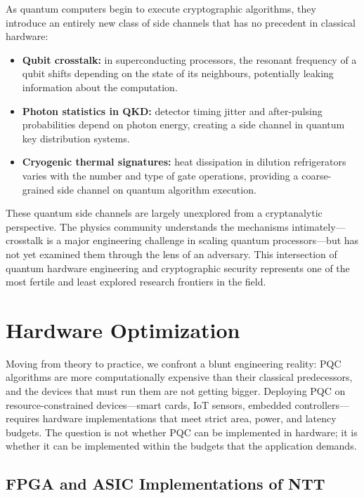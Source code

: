 As quantum computers begin to execute cryptographic algorithms, they introduce an entirely new class of side channels that has no precedent in classical hardware:
\begin{itemize}
\item \textbf{Qubit crosstalk:} in superconducting processors, the resonant frequency of a qubit shifts depending on the state of its neighbours, potentially leaking information about the computation.
\item \textbf{Photon statistics in QKD:} detector timing jitter and after-pulsing probabilities depend on photon energy, creating a side channel in quantum key distribution systems.
\item \textbf{Cryogenic thermal signatures:} heat dissipation in dilution refrigerators varies with the number and type of gate operations, providing a coarse-grained side channel on quantum algorithm execution.
\end{itemize}

These quantum side channels are largely unexplored from a cryptanalytic perspective.  The physics community understands the mechanisms intimately---crosstalk is a major engineering challenge in scaling quantum processors---but has not yet examined them through the lens of an adversary.  This intersection of quantum hardware engineering and cryptographic security represents one of the most fertile and least explored research frontiers in the field.


\section{Hardware Optimization}
\label{sec:hardware}

Moving from theory to practice, we confront a blunt engineering reality: PQC algorithms are more computationally expensive than their classical predecessors, and the devices that must run them are not getting bigger.  Deploying PQC on resource-constrained devices---smart cards, IoT sensors, embedded controllers---requires hardware implementations that meet strict area, power, and latency budgets.  The question is not whether PQC can be implemented in hardware; it is whether it can be implemented within the budgets that the application demands.

\subsection{FPGA and ASIC Implementations of NTT}
\label{subsec:ntt-hardware}

